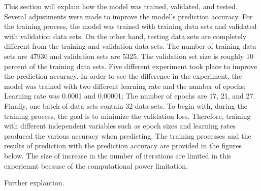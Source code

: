 This section will explain how the model was trained, validated, and tested. Several adjustments were
made to improve the model's prediction accuracy. For the training process, the model was trained with
training data sets and validated with validation data sets. On the other hand, testing data sets are
completely different from the training and validation data sets.
The number of training data sets are 47930 and validation sets are 5325. The validation set size is
roughly 10 percent of the training data sets. Five different experiment took place to improve the
prediction accuracy. In order to see the difference in the experiment, the model was trained with two
different learning rate and the number of epochs; Learning rate was 0.0001 and 0.00001; The number of
epochs are 17, 21, and 27. Finally, one batch of data sets contain 32 data sets.
\newline
\newline
\indent
To begin with, during the training process, the goal is to minimize the validation loss. Therefore,
training with different independent variables such as epoch sizes and learning rates produced the various
accuracy when predicting. The training processes and the results of prediction with the prediction accuracy are
provided in the figures below. The size of increase in the number of iterations are limited in this experiemnt
because of the computational power limitation.




Further explantion.